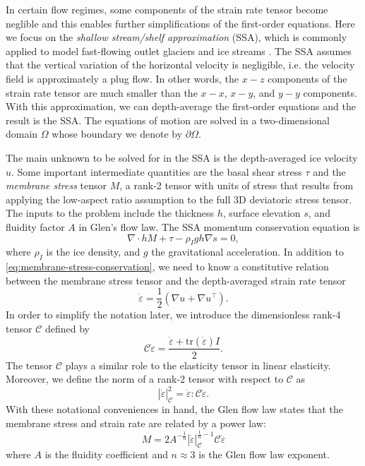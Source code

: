 \documentclass[twocolumn,letterpaper]{igs}
\begin{document}
In certain flow regimes, some components of the strain rate tensor become neglible and this enables further simplifications of the first-order equations.
Here we focus on the \emph{shallow stream/shelf approximation} (SSA), which is commonly applied to model fast-flowing outlet glaciers and ice streams \citep{greve2009dynamics}.
The SSA assumes that the vertical variation of the horizontal velocity is negligible, i.e. the velocity field is approximately a plug flow.
In other words, the $x-z$ components of the strain rate tensor are much smaller than the $x-x$, $x-y$, and $y-y$ components.
With this approximation, we can depth-average the first-order equations and the result is the SSA.
The equations of motion are solved in a two-dimensional domain $\Omega$ whose boundary we denote by $\partial\Omega$.

The main unknown to be solved for in the SSA is the depth-averaged ice velocity $u$.
Some important intermediate quantities are the basal shear stress $\tau$ and the \emph{membrane stress} tensor $M$, a rank-2 tensor with units of stress that results from applying the low-aspect ratio assumption to the full 3D deviatoric stress tensor.
The inputs to the problem include the thickness $h$, surface elevation $s$, and fluidity factor $A$ in Glen's flow law.
The SSA momentum conservation equation is
\begin{equation}
    \nabla\cdot hM + \tau - \rho_I gh\nabla s = 0,
    \label{eq:membrane-stress-conservation}
\end{equation}
where $\rho_I$ is the ice density, and $g$ the gravitational acceleration.
In addition to \eqref{eq:membrane-stress-conservation}, we need to know a constitutive relation between the membrane stress tensor and the depth-averaged strain rate tensor
\begin{equation}
    \dot\varepsilon = \frac{1}{2}\left(\nabla u + \nabla u^\top\right).
    \label{eq:strain-rate}
\end{equation}
In order to simplify the notation later, we introduce the dimensionless rank-4 tensor $\mathscr{C}$ defined by
\begin{equation}
    \mathscr{C}\dot\varepsilon = \frac{\dot\varepsilon + \text{tr}(\dot\varepsilon)I}{2}.
    \label{eq:elasticity-tensor}
\end{equation}
The tensor $\mathscr{C}$ plays a similar role to the elasticity tensor in linear elasticity.
Moreover, we define the norm of a rank-2 tensor with respect to $\mathscr{C}$ as
\begin{equation}
    |\dot\varepsilon|_{\mathscr{C}}^2 = \dot\varepsilon : \mathscr{C}\dot\varepsilon.
\end{equation}
With these notational conveniences in hand, the Glen flow law states that the membrane stress and strain rate are related by a power law:
\begin{equation}
    M = 2A^{-\frac{1}{n}}|\dot\varepsilon|_{\mathscr C}^{\frac{1}{n} - 1}\mathscr{C}\dot\varepsilon
    \label{eq:constitutive-relation}
\end{equation}
where $A$ is the fluidity coefficient and $n \approx 3$ is the Glen flow law exponent.
\end{document}
